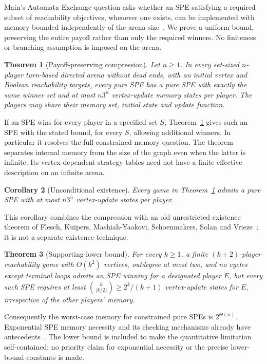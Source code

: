 \documentclass[acmlarge,11pt,screen,nonacm,natbib=false]{acmart}
\newtheorem{theorem}{Theorem}
\newtheorem{corollary}[theorem]{Corollary}
\theoremstyle{remark}
\begin{document}
Main's Automata Exchange question asks whether an SPE satisfying a required
subset of reachability objectives, whenever one exists, can be implemented
with memory bounded independently of the arena size~\cite{MainQuestion25}.
We prove a uniform bound, preserving the entire payoff rather than only the
required winners. No finiteness or branching assumption is imposed on the arena.

\begin{theorem}[Payoff-preserving compression]\label{thm:main}
Let $n\geq1$. In every set-sized $n$-player turn-based directed arena without
dead ends, with an initial vertex and Boolean reachability targets, every
pure SPE has a pure SPE with exactly the same winner set and at most $n3^n$
vertex-update memory states per player. The players may share their memory
set, initial state and update function.
\end{theorem}

If an SPE wins for every player in a specified set $S$, Theorem~\ref{thm:main}
gives such an SPE with the stated bound, for every $S$, allowing additional
winners. In particular it resolves the full constrained-memory question.
The theorem separates internal memory from the size of the graph even when
the latter is infinite. Its vertex-dependent strategy tables need not have
a finite effective description on an infinite arena.

\begin{corollary}[Unconditional existence]\label{cor:existence}
Every game in Theorem~\ref{thm:main} admits a pure SPE with at most $n3^n$
vertex-update states per player.
\end{corollary}

This corollary combines the compression with an old unrestricted existence
theorem of Flesch, Kuipers, Mashiah-Yaakovi, Schoenmakers, Solan and
Vrieze~\cite{FKMSSV10}; it is not a separate existence technique.

\begin{theorem}[Supporting lower bound]\label{thm:lower}
For every $k\geq1$, a finite $(k+2)$-player reachability game with $O(k^2)$
vertices, outdegree at most two, and no cycles except terminal loops admits
an SPE winning for a designated player $E$, but every such SPE requires at
least $\binom{k}{\lfloor k/2\rfloor}\geq2^k/(k+1)$ vertex-update states for
$E$, irrespective of the other players' memory.
\end{theorem}

Consequently the worst-case memory for constrained pure SPEs is
$2^{\Theta(n)}$. Exponential SPE memory necessity and its checking mechanisms
already have antecedents~\cite{BGMR23,FH12}. The lower bound is included to
make the quantitative limitation self-contained; no priority claim for
exponential necessity or the precise lower-bound constants is made.
\end{document}
